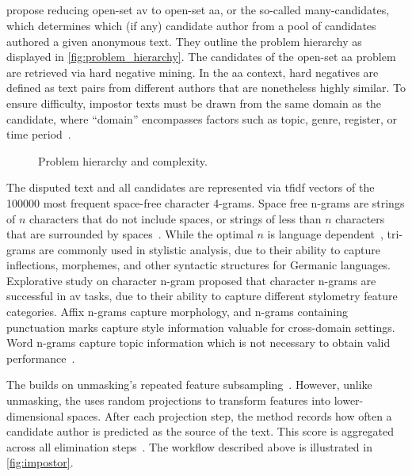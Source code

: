 \subsection{\impApprTitle{}}
\label{sec:impostor_method_theory}

\citet{koppel_determining_2014} propose reducing open-set \ac{av} to open-set \ac{aa}, or the so-called many-candidates, which determines which (if any) candidate author from a pool of candidates authored a given anonymous text. 
They outline the problem hierarchy as displayed in \autoref{fig:problem_hierarchy}.
The candidates of the open-set \ac{aa} problem are retrieved via hard negative mining. 
In the \ac{aa} context, hard negatives are defined as text pairs from different authors that are nonetheless highly similar. 
To ensure difficulty, impostor texts must be drawn from the same domain as the candidate, where “domain” encompasses factors such as topic, genre, register, or time period~\citep{bischoff_importance_2020}. 

\begin{figure}[htbp]
    \centering
    
    \caption{Problem hierarchy and complexity.}
    \label{fig:problem_hierarchy}
\end{figure}

The disputed text and all candidates are represented via \ac{tfidf} vectors of the \num{100000} most frequent space-free character 4-grams.
Space free n-grams are strings of $n$ characters that do not include spaces, or strings of less than $n$ characters that are surrounded by spaces~\citep{koppel_authorship_2011,neal_surveying_2018}.
While the optimal $n$ is language dependent~\citep{neal_surveying_2018}, tri-grams are commonly used in stylistic analysis, due to their ability to capture inflections, %
morphemes, %
and other syntactic structures for Germanic languages.
Explorative study on character n-gram proposed that character n-grams are successful in \ac{av} tasks, due to their ability to capture different stylometry feature categories.
Affix n-grams capture morphology, and n-grams containing punctuation marks capture style information valuable for cross-domain settings.
Word n-grams capture topic information which is not necessary to obtain valid performance~\citep{Sapkota_ngrams_2015}.

The \impAppr{} builds on unmasking's repeated feature subsampling~\citep{koppel_authorship_2004}. 
However, unlike unmasking, the \impAppr{} uses random projections to transform features into lower-dimensional spaces.
After each projection step, the method records how often a candidate author is predicted as the source of the text. 
This score is aggregated across all elimination steps~\citep{tyo_state_2022}.
The workflow described above is illustrated in \autoref{fig:impostor}.

